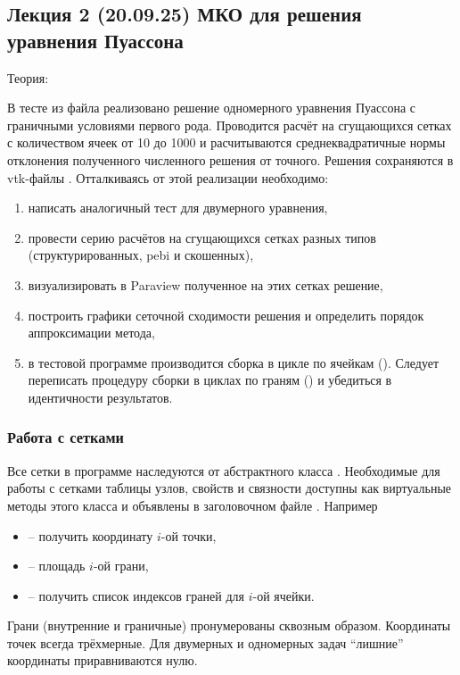 \subsection{Лекция 2 (20.09.25) МКО для решения уравнения Пуассона}
\label{sec:hw_fvm2d}
Теория: 

В тесте  из файла 
реализовано решение одномерного уравнения Пуассона с граничными условиями первого рода.
Проводится расчёт на сгущающихся сетках с количеством ячеек от 10 до 1000
и расчитываются среднеквадратичные нормы отклонения полученного численного решения от точного.
Решения сохраняются в vtk-файлы .
Отталкиваясь от этой реализации необходимо:
\begin{enumerate}
\item написать аналогичный тест для двумерного уравнения,
\item провести серию расчётов на сгущающихся сетках разных типов (структурированных, pebi и скошенных),
\item визуализировать в Paraview полученное на этих сетках решение,
\item построить графики сеточной сходимости решения и определить порядок аппроксимации метода,
\item в тестовой программе производится сборка в цикле по ячейкам ().
      Следует переписать процедуру сборки в циклах по граням () и убедиться
      в идентичности результатов.
\end{enumerate}

\subsubsection{Работа с сетками}
Все сетки в программе наследуются от абстрактного класса .
Необходимые для работы с сетками таблицы узлов, свойств и связности доступны
как виртуальные методы этого класса и объявлены в заголовочном файле . Например
\begin{itemize}
\item {} -- получить координату $i$-ой точки,
\item {} -- площадь $i$-ой грани,
\item {} -- получить список индексов граней для $i$-ой ячейки.
\end{itemize}
Грани (внутренние и граничные) пронумерованы сквозным образом.
Координаты точек всегда трёхмерные. Для двумерных и одномерных задач ``лишние'' координаты приравниваются нулю.

